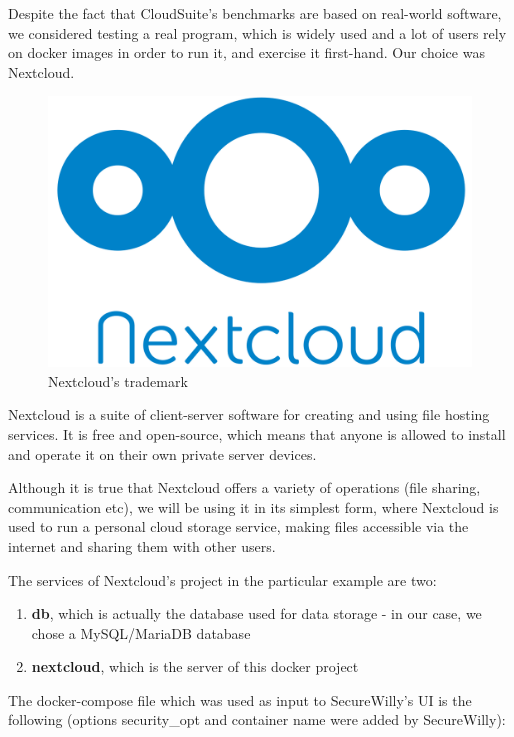 Despite the fact that CloudSuite's benchmarks are based on real-world software, we considered testing a real program, which is widely used and a lot of users rely on docker images in order to run it, and exercise it first-hand. Our choice was Nextcloud.

\begin{figure}[h!]
  \centering
   \includegraphics[width=0.3\linewidth]{../figures/Nextcloud.png}
   \caption{Nextcloud's trademark}
\end{figure}

Nextcloud is a suite of client-server software for creating and using file hosting services. It is free and open-source, which means that anyone is allowed to install and operate it on their own private server devices. \cite{wikinext}

Although it is true that Nextcloud offers a variety of operations (file sharing, communication etc), we will be using it in its simplest form, where Nextcloud is used to run a personal cloud storage service, making files accessible via the internet and sharing them with other users.

The services of Nextcloud's project in the particular example are two:
\begin{enumerate}
\item \textbf{db}, which is actually the database used for data storage - in our case, we chose a MySQL/MariaDB database
\item \textbf{nextcloud}, which is the server of this docker project
\end{enumerate}

The docker-compose file which was used as input to SecureWilly's UI is the following (options security\_opt and container name were added by SecureWilly):

